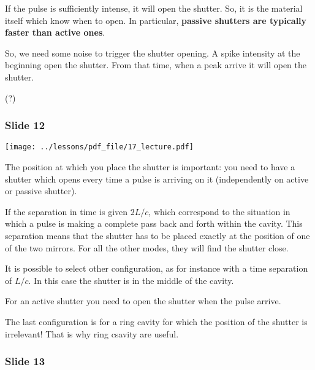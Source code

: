 \documentclass[../main/main.tex]{subfiles}
\begin{document}
If the pulse is sufficiently intense, it will open the shutter. So, it is the material itself which know when to open.
In particular, \textbf{passive shutters are typically faster than active ones}.

So, we need some noise to trigger the shutter opening.
A spike intensity at the beginning open the shutter. From that time, when a peak arrive it will open the shutter.

(?)

\subsubsection*{Slide 12}

\begin{minipage}[]{0.5\linewidth}
\centering
\texttt{[image: ../lessons/pdf\_file/17\_lecture.pdf]}
\end{minipage}
\hspace{0.3cm}\vspace{0.3cm}
\begin{minipage}[c]{0.47\linewidth}

The position at which you place the shutter is important: you need to have a shutter which opens every time a pulse is arriving on it (independently on active or passive shutter).

If the separation in time is given \( 2L/c \), which correspond to the situation in which a pulse is making a complete pass back and forth within the cavity. This separation means that the shutter has to be placed exactly at the position of one of the two mirrors.
For all the other modes, they will find the shutter close.

It is possible to select other configuration, as for instance with a time separation of \( L/c \). In this case the shutter is in the middle of the cavity.

For an active shutter you need to open the shutter when the pulse arrive.


The last configuration is for a ring cavity for which the position of the shutter is irrelevant! That is why ring csavity are useful.

\end{minipage}

\subsubsection*{Slide 13}
\end{document}
